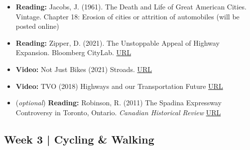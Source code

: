 \documentclass[11pt]{article}
\begin{document}
	\begin{itemize}
		
		\item \textbf{Reading:} Jacobs, J. (1961). The Death and Life of Great American Cities. Vintage.
		Chapter 18: Erosion of cities or attrition of automobiles (will be posted online)
					
		
		\item \textbf{Reading:} Zipper, D. (2021). The Unstoppable Appeal of Highway Expansion. Bloomberg CityLab. \href{https://www.bloomberg.com/news/features/2021-09-28/why-widening-highways-doesn-t-bring-traffic-relief}{URL}
		
		\item \textbf{Video:} Not Just Bikes (2021) Stroads. \href{https://www.youtube.com/watch?v=ORzNZUeUHAM}{URL}
		
		\item \textbf{Video:} TVO (2018) 
		Highways and our Transportation Future \href{https://www.tvo.org/video/highways-and-our-transportation-future}{URL}
		
		\item (\textit{optional}) \textbf{Reading:} Robinson, R. (2011) The Spadina Expressway Controversy in Toronto, Ontario. \textit{ Canadian Historical Review} \href{https://www.utpjournals.press/doi/pdf/10.3138/chr.92.2.295}{URL}
	\end{itemize}




	
	


	\subsection*{Week 3 | Cycling \& Walking}
	
\end{document}
